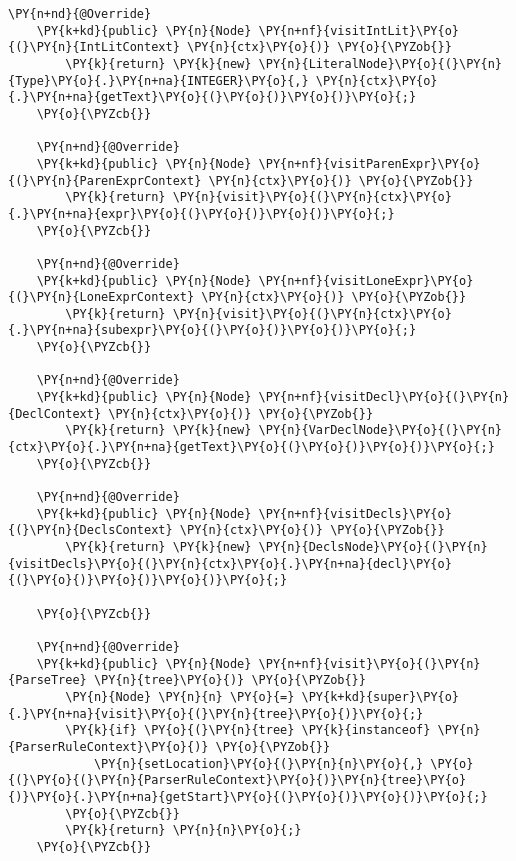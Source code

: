 \begin{Verbatim}[commandchars=\\\{\}]
    \PY{n+nd}{@Override}
    \PY{k+kd}{public} \PY{n}{Node} \PY{n+nf}{visitIntLit}\PY{o}{(}\PY{n}{IntLitContext} \PY{n}{ctx}\PY{o}{)} \PY{o}{\PYZob{}}
        \PY{k}{return} \PY{k}{new} \PY{n}{LiteralNode}\PY{o}{(}\PY{n}{Type}\PY{o}{.}\PY{n+na}{INTEGER}\PY{o}{,} \PY{n}{ctx}\PY{o}{.}\PY{n+na}{getText}\PY{o}{(}\PY{o}{)}\PY{o}{)}\PY{o}{;}
    \PY{o}{\PYZcb{}}

    \PY{n+nd}{@Override}
    \PY{k+kd}{public} \PY{n}{Node} \PY{n+nf}{visitParenExpr}\PY{o}{(}\PY{n}{ParenExprContext} \PY{n}{ctx}\PY{o}{)} \PY{o}{\PYZob{}}
        \PY{k}{return} \PY{n}{visit}\PY{o}{(}\PY{n}{ctx}\PY{o}{.}\PY{n+na}{expr}\PY{o}{(}\PY{o}{)}\PY{o}{)}\PY{o}{;}
    \PY{o}{\PYZcb{}}

    \PY{n+nd}{@Override}
    \PY{k+kd}{public} \PY{n}{Node} \PY{n+nf}{visitLoneExpr}\PY{o}{(}\PY{n}{LoneExprContext} \PY{n}{ctx}\PY{o}{)} \PY{o}{\PYZob{}}
        \PY{k}{return} \PY{n}{visit}\PY{o}{(}\PY{n}{ctx}\PY{o}{.}\PY{n+na}{subexpr}\PY{o}{(}\PY{o}{)}\PY{o}{)}\PY{o}{;}
    \PY{o}{\PYZcb{}}

    \PY{n+nd}{@Override}
    \PY{k+kd}{public} \PY{n}{Node} \PY{n+nf}{visitDecl}\PY{o}{(}\PY{n}{DeclContext} \PY{n}{ctx}\PY{o}{)} \PY{o}{\PYZob{}}
        \PY{k}{return} \PY{k}{new} \PY{n}{VarDeclNode}\PY{o}{(}\PY{n}{ctx}\PY{o}{.}\PY{n+na}{getText}\PY{o}{(}\PY{o}{)}\PY{o}{)}\PY{o}{;}
    \PY{o}{\PYZcb{}}
    
    \PY{n+nd}{@Override}
    \PY{k+kd}{public} \PY{n}{Node} \PY{n+nf}{visitDecls}\PY{o}{(}\PY{n}{DeclsContext} \PY{n}{ctx}\PY{o}{)} \PY{o}{\PYZob{}}
        \PY{k}{return} \PY{k}{new} \PY{n}{DeclsNode}\PY{o}{(}\PY{n}{visitDecls}\PY{o}{(}\PY{n}{ctx}\PY{o}{.}\PY{n+na}{decl}\PY{o}{(}\PY{o}{)}\PY{o}{)}\PY{o}{)}\PY{o}{;}
        
    \PY{o}{\PYZcb{}}

    \PY{n+nd}{@Override}
    \PY{k+kd}{public} \PY{n}{Node} \PY{n+nf}{visit}\PY{o}{(}\PY{n}{ParseTree} \PY{n}{tree}\PY{o}{)} \PY{o}{\PYZob{}}
        \PY{n}{Node} \PY{n}{n} \PY{o}{=} \PY{k+kd}{super}\PY{o}{.}\PY{n+na}{visit}\PY{o}{(}\PY{n}{tree}\PY{o}{)}\PY{o}{;}
        \PY{k}{if} \PY{o}{(}\PY{n}{tree} \PY{k}{instanceof} \PY{n}{ParserRuleContext}\PY{o}{)} \PY{o}{\PYZob{}}
            \PY{n}{setLocation}\PY{o}{(}\PY{n}{n}\PY{o}{,} \PY{o}{(}\PY{o}{(}\PY{n}{ParserRuleContext}\PY{o}{)}\PY{n}{tree}\PY{o}{)}\PY{o}{.}\PY{n+na}{getStart}\PY{o}{(}\PY{o}{)}\PY{o}{)}\PY{o}{;}
        \PY{o}{\PYZcb{}}
        \PY{k}{return} \PY{n}{n}\PY{o}{;}
    \PY{o}{\PYZcb{}}
    

\end{Verbatim}
